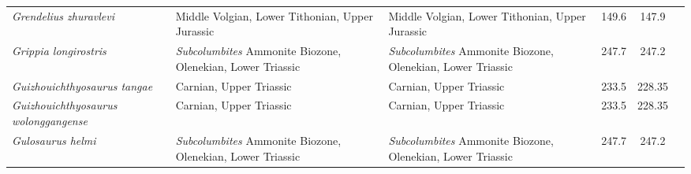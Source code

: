 \begin{longtabu}{>{\itshape}lXXSSl}
	Grendelius zhuravlevi                                & Middle Volgian,
        Lower Tithonian, Upper Jurassic
                                                             & Middle Volgian,
        Lower Tithonian, Upper Jurassic
                                                             & 149.6
                                                             & 147.9
                                                             &
                                                             \cite{Zverkov2015PZIRa} \\                   
	Grippia longirostris                                 &
        \emph{Subcolumbites} Ammonite Biozone, Olenekian, Lower Triassic
                                                             &
        \emph{Subcolumbites} Ammonite Biozone, Olenekian, Lower Triassic
                                                             & 247.7
                                                             & 247.2
                                                             & \cite{Motani2000P} \\                     
	Guizhouichthyosaurus tangae                          & Carnian, Upper
        Triassic
                                                             & Carnian, Upper
        Triassic
                                                             & 233.5
                                                             & 228.35
                                                             &
                                                             \cite{Pan2006ASNUP} \\                        
	Guizhouichthyosaurus wolonggangense                  & Carnian, Upper
        Triassic
                                                             & Carnian, Upper
        Triassic
                                                             & 233.5
                                                             & 228.35
                                                             & \cite{Chen2007GC} \\                       
	Gulosaurus helmi                                     &
        \emph{Subcolumbites} Ammonite Biozone, Olenekian, Lower Triassic
                                                             &
        \emph{Subcolumbites} Ammonite Biozone, Olenekian, Lower Triassic
                                                             & 247.7
                                                             & 247.2
                                                             &
                                                             \cite{Brinkman1992P,Cuthbertson2013JVP} \\  

\end{longtabu}

